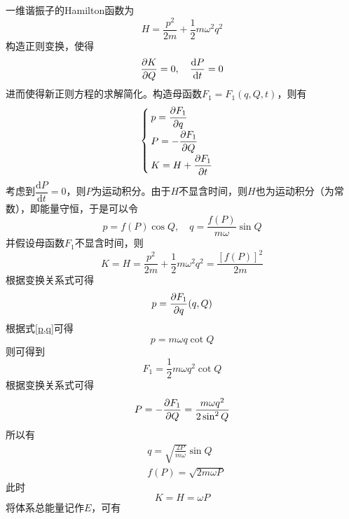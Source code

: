 \begin{example}[一维谐振子的正则变换求解]
一维谐振子的Hamilton函数为
\begin{equation*}
	H = \frac{p^2}{2m} + \frac12 m\omega^2 q^2
\end{equation*}
构造正则变换，使得
\begin{equation*}
	\frac{\partial K}{\partial Q} = 0,\quad \frac{\mathrm{d} P}{\mathrm{d} t} = 0
\end{equation*}
进而使得新正则方程的求解简化。构造母函数$F_1 = F_1(q,Q,t)$，则有
\begin{equation*}
	\begin{cases}
		\displaystyle p = \frac{\partial F_1}{\partial q} \\[1.5ex]
		\displaystyle P = -\frac{\partial F_1}{\partial Q} \\[1.5ex]
		\displaystyle K = H + \frac{\partial F_1}{\partial t}
	\end{cases}
\end{equation*}
考虑到$\dfrac{\mathrm{d} P}{\mathrm{d} t} = 0$，则$P$为运动积分。由于$H$不显含时间，则$H$也为运动积分（为常数），即能量守恒，于是可以令
\begin{equation}
	p = f(P) \cos Q,\quad q = \frac{f(P)}{m\omega} \sin Q
	\label{p,q}
\end{equation}
并假设母函数$F_1$不显含时间，则
\begin{equation*}
	K = H = \frac{p^2}{2m} + \frac12 m\omega^2 q^2 = \frac{[f(P)]^2}{2m}
\end{equation*}
根据变换关系式可得
\begin{equation*}
	p = \frac{\partial F_1}{\partial q}(q,Q)
\end{equation*}
根据式\eqref{p,q}可得
\begin{equation*}
	p = m\omega q \cot Q
\end{equation*}
则可得到
\begin{equation*}
	F_1 = \frac12 m\omega q^2 \cot Q 
\end{equation*}
根据变换关系式可得
\begin{equation*}
	P = -\frac{\partial F_1}{\partial Q} = \frac{m\omega q^2}{2\sin^2 Q}
\end{equation*}
所以有
\begin{align*}
	& q = \sqrt{\frac{2P}{m\omega}} \sin Q \\
	& f(P) = \sqrt{2m\omega P}
\end{align*}
此时
\begin{equation*}
	K = H = \omega P
\end{equation*}
将体系总能量记作$E$，可有
\begin{equation*}

\end{equation*}
\end{example}
